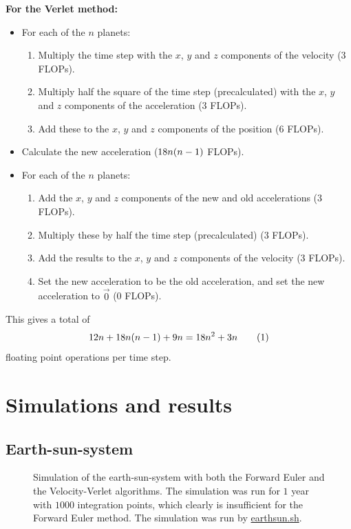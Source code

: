 \documentclass[12pt,english,a4paper]{article}
\newcommand{\eqtag}[1]{\refstepcounter{equation}\tag{\theequation}\label{#1}}
\newcommand{\program}[1]{\href{https://github.com/anjohan/Offentlig/blob/master/FYS3150/Oblig3/#1}{#1}}
\begin{document}
\textbf{For the Verlet method:}
\begin{itemize}
\item For each of the \(n\) planets:
\begin{enumerate}
\item Multiply the time step with the \(x\), \(y\) and \(z\) components of the velocity (3 FLOPs).
\item Multiply half the square of the time step (precalculated) with the \(x\), \(y\) and \(z\) components of the acceleration (3 FLOPs).
\item Add these to the \(x\), \(y\) and \(z\) components of the position (6 FLOPs).
\end{enumerate}
\item Calculate the new acceleration (\(18n\qty(n-1)\) FLOPs).
\item For each of the \(n\) planets:
\begin{enumerate}
\item Add the \(x\), \(y\) and \(z\) components of the new and old accelerations (3 FLOPs).
\item Multiply these by half the time step (precalculated) (3 FLOPs).
\item Add the results to the \(x\), \(y\) and \(z\) components of the velocity (3 FLOPs).
\item Set the new acceleration to be the old acceleration, and set the new acceleration to \(\vec{0}\) (0 FLOPs).
\end{enumerate}
\end{itemize}
This gives a total of \[12n + 18n\qty(n-1) + 9n = 18n^2+3n\eqtag{verletflops}\] floating point operations per time step.

%
\section{Simulations and results}

\subsection{Earth-sun-system}
\begin{figure}[H]
\centering

\caption{Simulation of the earth-sun-system with both the Forward Euler and the Velocity-Verlet algorithms. The simulation was run for \(1\) year with \(\num{1000}\) integration points, which clearly is insufficient for the Forward Euler method. The simulation was run by \program{earthsun.sh}.}
\end{figure}
\end{document}
